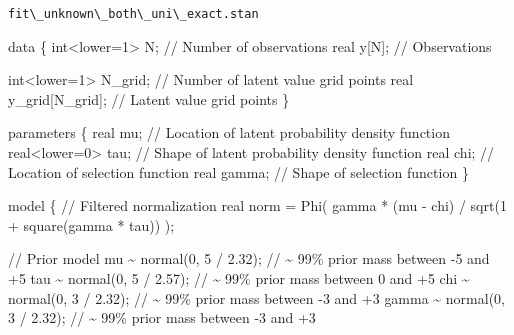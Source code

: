 \documentclass[
  letterpaper,
  DIV=11,
  numbers=noendperiod]{scrartcl}
\newenvironment{Shaded}{\begin{snugshade}}{\end{snugshade}}
\newcommand{\CommentTok}[1]{\textcolor[rgb]{0.37,0.37,0.37}{#1}}
\newcommand{\DataTypeTok}[1]{\textcolor[rgb]{0.68,0.00,0.00}{#1}}
\newcommand{\DecValTok}[1]{\textcolor[rgb]{0.68,0.00,0.00}{#1}}
\newcommand{\FloatTok}[1]{\textcolor[rgb]{0.68,0.00,0.00}{#1}}
\newcommand{\KeywordTok}[1]{\textcolor[rgb]{0.00,0.23,0.31}{#1}}
\newcommand{\NormalTok}[1]{\textcolor[rgb]{0.00,0.23,0.31}{#1}}
\begin{document}
\begin{codelisting}

\caption{\texttt{fit\textbackslash\_unknown\textbackslash\_both\textbackslash\_uni\textbackslash\_exact.stan}}

\begin{Shaded}
\begin{Highlighting}[]
\KeywordTok{data}\NormalTok{ \{}
  \DataTypeTok{int}\NormalTok{\textless{}}\KeywordTok{lower}\NormalTok{=}\DecValTok{1}\NormalTok{\textgreater{} N; }\CommentTok{// Number of observations}
  \DataTypeTok{real}\NormalTok{ y[N];      }\CommentTok{// Observations}

  \DataTypeTok{int}\NormalTok{\textless{}}\KeywordTok{lower}\NormalTok{=}\DecValTok{1}\NormalTok{\textgreater{} N\_grid; }\CommentTok{// Number of latent value grid points}
  \DataTypeTok{real}\NormalTok{ y\_grid[N\_grid]; }\CommentTok{// Latent value grid points}
\NormalTok{\}}

\KeywordTok{parameters}\NormalTok{ \{}
  \DataTypeTok{real}\NormalTok{ mu;           }\CommentTok{// Location of latent probability density function}
  \DataTypeTok{real}\NormalTok{\textless{}}\KeywordTok{lower}\NormalTok{=}\DecValTok{0}\NormalTok{\textgreater{} tau; }\CommentTok{// Shape of latent probability density function}
  \DataTypeTok{real}\NormalTok{ chi;          }\CommentTok{// Location of selection function}
  \DataTypeTok{real}\NormalTok{ gamma;        }\CommentTok{// Shape of selection function}
\NormalTok{\}}

\KeywordTok{model}\NormalTok{ \{}
  \CommentTok{// Filtered normalization}
  \DataTypeTok{real}\NormalTok{ norm = Phi( gamma * (mu {-} chi) / sqrt(}\DecValTok{1}\NormalTok{ + square(gamma * tau)) );}
  
  \CommentTok{// Prior model}
\NormalTok{  mu \textasciitilde{} normal(}\DecValTok{0}\NormalTok{, }\DecValTok{5}\NormalTok{ / }\FloatTok{2.32}\NormalTok{);   }\CommentTok{// \textasciitilde{} 99\% prior mass between {-}5 and +5}
\NormalTok{  tau \textasciitilde{} normal(}\DecValTok{0}\NormalTok{, }\DecValTok{5}\NormalTok{ / }\FloatTok{2.57}\NormalTok{);  }\CommentTok{// \textasciitilde{} 99\% prior mass between 0 and +5}
\NormalTok{  chi \textasciitilde{} normal(}\DecValTok{0}\NormalTok{, }\DecValTok{3}\NormalTok{ / }\FloatTok{2.32}\NormalTok{);   }\CommentTok{// \textasciitilde{} 99\% prior mass between {-}3 and +3}
\NormalTok{  gamma \textasciitilde{} normal(}\DecValTok{0}\NormalTok{, }\DecValTok{3}\NormalTok{ / }\FloatTok{2.32}\NormalTok{); }\CommentTok{// \textasciitilde{} 99\% prior mass between {-}3 and +3}
  

\end{Highlighting}
\end{Shaded}
\end{codelisting}
\end{document}

